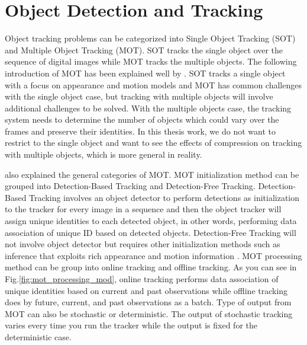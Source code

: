 \section{Object Detection and Tracking}
\label{sec:introduction/section_a}

Object tracking problems can be categorized into Single Object Tracking (SOT) and Multiple Object Tracking (MOT). SOT tracks the single object over the sequence of digital images while MOT tracks the multiple objects. The following introduction of MOT has been explained well by \citeauthor{luo_multiple_2021} \cite{luo_multiple_2021}. SOT tracks a single object with a focus on appearance and motion models and MOT has common challenges with the single object case, but tracking with multiple objects will involve additional challenges to be solved. With the multiple objects case, the tracking system needs to determine the number of objects which could vary over the frames and preserve their identities. In this thesis work, we do not want to restrict to the single object and want to see the effects of compression on tracking with multiple objects, which is more general in reality.

\citeauthor{luo_multiple_2021} also explained the general categories of MOT. MOT initialization method can be grouped into Detection-Based Tracking and Detection-Free Tracking. Detection-Based Tracking involves an object detector to perform detections as initialization to the tracker for every image in a sequence and then the object tracker will assign unique identities to each detected object, in other words, performing data association of unique ID based on detected objects. Detection-Free Tracking will not involve object detector but requires other initialization methods such as inference that exploits rich appearance and motion information \cite{lin_detection-free_2016}. MOT processing method can be group into online tracking and offline tracking. As you can see in Fig.\ref{fig:mot_processing_mod}, online tracking performs data association of unique identities based on current and past observations while offline tracking does by future, current, and past observations as a batch. Type of output from MOT can also be stochastic or deterministic. The output of stochastic tracking varies every time you run the tracker while the output is fixed for the deterministic case.



